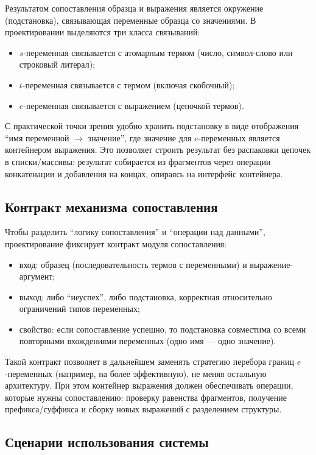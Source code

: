 \documentclass[14pt, russian]{scrartcl}
\newcommand{\enq}[1]{\enquote{#1}}
\begin{document}
Результатом сопоставления образца и выражения является окружение (подстановка), связывающая переменные образца со значениями.
В проектировании выделяются три класса связываний:
\begin{itemize}
  \item \(s\)-переменная связывается с атомарным термом (число, символ-слово или строковый литерал);
  \item \(t\)-переменная связывается с термом (включая скобочный);
  \item \(e\)-переменная связывается с выражением (цепочкой термов).
\end{itemize}

С практической точки зрения удобно хранить подстановку в виде отображения \enq{имя переменной \(\rightarrow\) значение}, где значение
для \(e\)-переменных является контейнером выражения. Это позволяет строить результат без распаковки цепочек в списки/массивы:
результат собирается из фрагментов через операции конкатенации и добавления на концах, опираясь на интерфейс контейнера.

\subsection{Контракт механизма сопоставления}

Чтобы разделить \enq{логику сопоставления} и \enq{операции над данными}, проектирование фиксирует контракт модуля сопоставления:
\begin{itemize}
  \item вход: образец (последовательность термов с переменными) и выражение-аргумент;
  \item выход: либо \enq{неуспех}, либо подстановка, корректная относительно ограничений типов переменных;
  \item свойство: если сопоставление успешно, то подстановка совместима со всеми повторными вхождениями переменных (одно имя --- одно значение).
\end{itemize}

Такой контракт позволяет в дальнейшем заменять стратегию перебора границ \(e\)-переменных (например, на более эффективную),
не меняя остальную архитектуру. При этом контейнер выражения должен обеспечивать операции, которые нужны сопоставлению: проверку равенства
фрагментов, получение префикса/суффикса и сборку новых выражений с разделением структуры.

\subsection{Сценарии использования системы}
\end{document}
